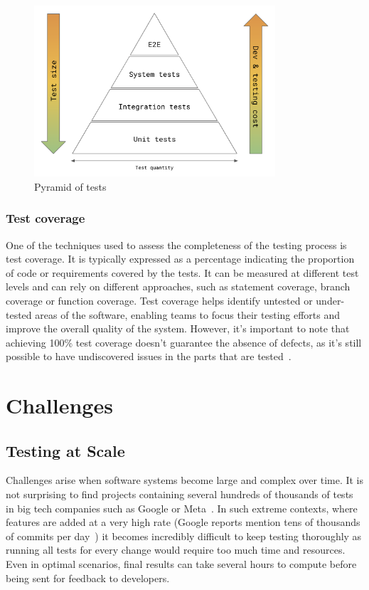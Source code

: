 \begin{figure}[ht]
\centering
\includegraphics[width=0.8\textwidth]{figures/core/pyramid.png}
\caption{Pyramid of tests}
\label{fig:pyramid}
\end{figure}

\subsubsection{Test coverage}

One of the techniques used to assess the completeness of the testing process is test coverage. It is typically expressed as a percentage indicating the proportion of code or requirements covered by the tests. It can be measured at different test levels and can rely on different approaches, such as statement coverage, branch coverage or function coverage. Test coverage helps identify untested or under-tested areas of the software, enabling teams to focus their testing efforts and improve the overall quality of the system. However, it's important to note that achieving 100\% test coverage doesn't guarantee the absence of defects, as it's still possible to have undiscovered issues in the parts that are tested~\cite{malaiya2002software,malaiya1994relationship}.

\section{Challenges}

\subsection{Testing at Scale}

Challenges arise when software systems become large and complex over time. It is not surprising to find projects containing several hundreds of thousands of tests in big tech companies such as Google or Meta~\cite{Micco2017,Harman2018}. In such extreme contexts, where features are added at a very high rate (Google reports mention tens of thousands of commits per day~\cite{ivankovic2019code}) it becomes incredibly difficult to keep testing thoroughly as running all tests for every change would require too much time and resources. Even in optimal scenarios, final results can take several hours to compute before being sent for feedback to developers. \\

